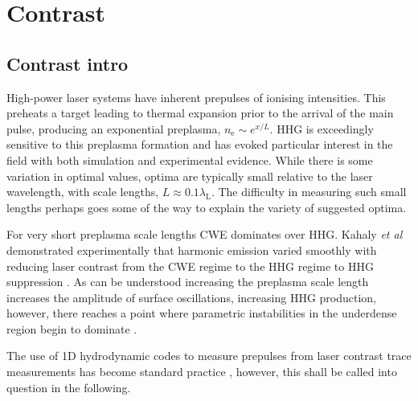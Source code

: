 \section{Contrast}\label{sec:ch4-contrast}

\subsection{Contrast intro}
High-power laser systems have inherent prepulses of ionising intensities. This preheats a target leading to thermal expansion prior to the arrival of the main pulse, producing an exponential preplasma, $n_\mathrm{e} \sim e^{x/L}$. HHG is exceedingly sensitive to this preplasma formation and has evoked particular interest in the field \cite{behmkeControllingSpacingAttosecond2011, rodelHarmonicGenerationRelativistic2012, dollarScalingHighorderHarmonic2013, kahalyDirectObservationDensityGradient2013, vincentiAchievingExtremeLight2019,behmkeControllingSpacingAttosecond2011} with both simulation and experimental evidence. While there is some variation in optimal values, optima are typically small relative to the laser wavelength, with scale lengths, $L \approx 0.1 \lambda_\mathrm{L}$. The difficulty in measuring such small lengths perhaps goes some of the way to explain the variety of suggested optima. 

For very short preplasma scale lengths \ac{CWE} dominates over HHG. Kahaly \textit{et al} demonstrated experimentally that harmonic emission varied smoothly with reducing laser contrast from the CWE regime to the HHG regime to HHG suppression \cite{kahalyDirectObservationDensityGradient2013}. As can be understood increasing the preplasma scale length increases the amplitude of surface oscillations, increasing HHG production, however, there reaches a point where parametric instabilities in the underdense region begin to dominate \cite{dollarScalingHighorderHarmonic2013}.

The use of 1D hydrodynamic codes to measure prepulses from laser contrast trace measurements has become standard practice \cite{behmkeControllingSpacingAttosecond2011, dollarScalingHighorderHarmonic2013, liExperimentalDemonstrationEfficient2022}, however, this shall be called into question in the following.

